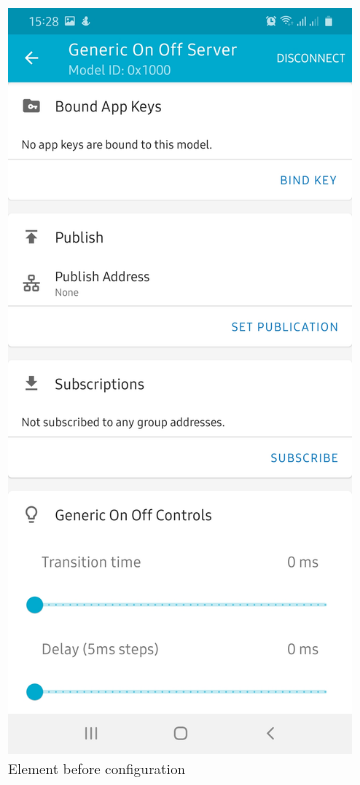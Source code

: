 \documentclass[\main/main.tex]{subfiles}
\begin{document}
\begin{figure}[H]
    \centering
    \begin{subfigure}[b]{0.4\linewidth}
        \centering
        \includegraphics[width=0.7\linewidth]{nRF_Mesh_06.jpg}
        \caption{Element before configuration}
    \end{subfigure}
    \begin{subfigure}[b]{0.4\linewidth}
        \centering

\end{subfigure}
\end{figure}
\end{document}
